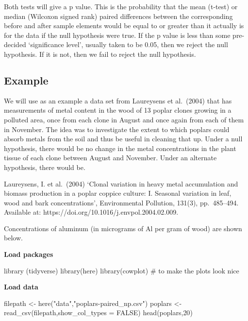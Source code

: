 \documentclass[
  letterpaper,
  DIV=11,
  numbers=noendperiod]{scrreprt}
\newenvironment{Shaded}{\begin{snugshade}}{\end{snugshade}}
\newcommand{\AttributeTok}[1]{\textcolor[rgb]{0.40,0.45,0.13}{#1}}
\newcommand{\CommentTok}[1]{\textcolor[rgb]{0.37,0.37,0.37}{#1}}
\newcommand{\ConstantTok}[1]{\textcolor[rgb]{0.56,0.35,0.01}{#1}}
\newcommand{\DecValTok}[1]{\textcolor[rgb]{0.68,0.00,0.00}{#1}}
\newcommand{\FunctionTok}[1]{\textcolor[rgb]{0.28,0.35,0.67}{#1}}
\newcommand{\NormalTok}[1]{\textcolor[rgb]{0.00,0.23,0.31}{#1}}
\newcommand{\OtherTok}[1]{\textcolor[rgb]{0.00,0.23,0.31}{#1}}
\newcommand{\StringTok}[1]{\textcolor[rgb]{0.13,0.47,0.30}{#1}}
\begin{document}
Both tests will give a p value. This is the probability that the mean
(t-test) or median (Wilcoxon signed rank) paired differences between the
corresponding before and after sample elements would be equal to or
greater than it actually is for the data if the null hypothesis were
true. If the p value is less than some pre-decided `significance level',
usually taken to be 0.05, then we reject the null hypothesis. If it is
not, then we fail to reject the null hypothesis.

\subsection{Example}\label{example-1}

We will use as an example a data set from Laureysens et al.~(2004) that
has measurements of metal content in the wood of 13 poplar clones
growing in a polluted area, once from each clone in August and once
again from each of them in November. The idea was to investigate the
extent to which poplars could absorb metals from the soil and thus be
useful in cleaning that up. Under a null hypothesis, there would be no
change in the metal concentrations in the plant tissue of each clone
between August and November. Under an alternate hypothesis, there would
be.

Laureysens, I. et al.~(2004) `Clonal variation in heavy metal
accumulation and biomass production in a poplar coppice culture: I.
Seasonal variation in leaf, wood and bark concentrations', Environmental
Pollution, 131(3), pp.~485--494. Available at:
https://doi.org/10.1016/j.envpol.2004.02.009.

Concentrations of aluminum (in micrograms of Al per gram of wood) are
shown below.

\textbf{Load packages}

\begin{Shaded}
\begin{Highlighting}[]
\FunctionTok{library}\NormalTok{ (tidyverse)}
\FunctionTok{library}\NormalTok{(here)}
\FunctionTok{library}\NormalTok{(cowplot) }\CommentTok{\# to make the plots look nice}
\end{Highlighting}
\end{Shaded}

\textbf{Load data}

\begin{Shaded}
\begin{Highlighting}[]
\NormalTok{filepath }\OtherTok{\textless{}{-}} \FunctionTok{here}\NormalTok{(}\StringTok{"data"}\NormalTok{,}\StringTok{"poplars{-}paired\_np.csv"}\NormalTok{)}
\NormalTok{poplars }\OtherTok{\textless{}{-}} \FunctionTok{read\_csv}\NormalTok{(filepath,}\AttributeTok{show\_col\_types =} \ConstantTok{FALSE}\NormalTok{)}
\FunctionTok{head}\NormalTok{(poplars,}\DecValTok{20}\NormalTok{)}
\end{Highlighting}
\end{Shaded}
\end{document}
